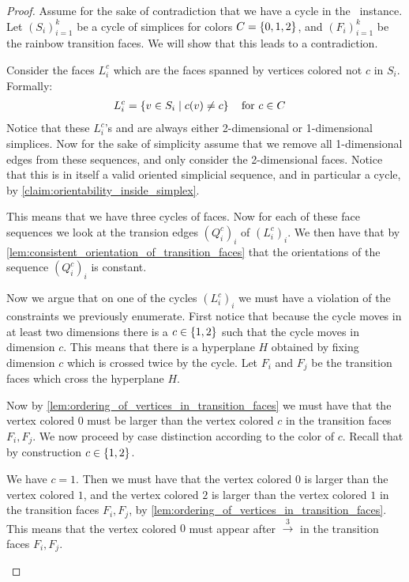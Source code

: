 \begin{proof}
	Assume for the sake of contradiction that we have a cycle in the \EndOfLine\ instance. Let ${\left(S_i\right)}_{i=1}^k$ be a cycle of simplices for colors $C = \left\{0, 1, 2\right\}$, and ${\left(F_i\right)}_{i=1}^k$ be the rainbow transition faces. We will show that this leads to a contradiction. \par
	Consider the faces $L_i^{c}$ which are the faces spanned by vertices colored not $c$ in $S_i$. Formally:
	\begin{align*}
		L_i^c & = \left\{v \in S_i \mid c(v) \neq c\right\} \quad \text{for $c \in C$}
	\end{align*}
	Notice that these $L_i^c$'s and are always either 2-dimensional or 1-dimensional simplices. Now for the sake of simplicity assume that we remove all 1-dimensional edges from these sequences, and only consider the 2-dimensional faces. Notice that this is in itself a valid oriented simplicial sequence, and in particular a cycle, by \cref{claim:orientability_inside_simplex}.

	This means that we have three cycles of faces. Now for each of these face sequences we look at the transion edges ${\left(Q_i^c\right)}_i$ of ${\left(L_i^c \right)}_i$.
	We then have that by \cref{lem:consistent_orientation_of_transition_faces} that the orientations of the sequence ${\left(Q_i^c\right)}_i$ is constant.

	Now we argue that on one of the cycles ${\left(L_i^c\right)_i}$ we must have a violation of the constraints we previously enumerate. First notice that because the cycle moves in at least two dimensions there is a $c \in \left\{1, 2\right\}$ such that the cycle moves in dimension $c$. This means that there is a hyperplane $H$ obtained by fixing dimension $c$ which is crossed twice by the cycle. Let $F_i$ and $F_j$ be the transition faces which cross the hyperplane $H$.

	Now by \cref{lem:ordering_of_vertices_in_transition_faces} we must have that the vertex colored $0$ must be larger than the vertex colored $c$ in the transition faces $F_i, F_j$. We now proceed by case distinction according to the color of $c$. Recall that by construction $c \in \left\{1, 2\right\}$.

	\begin{case}{1}
		We have $c=1$. Then we must have that the vertex colored $0$ is larger than the vertex colored $1$, and the vertex colored $2$ is larger than the vertex colored $1$ in the transition faces $F_i, F_j$, by \cref{lem:ordering_of_vertices_in_transition_faces}. This means that the vertex colored $0$ must appear after $\xrightarrow{3}$ in the transition faces $F_i, F_j$.


\end{case}
\end{proof}
